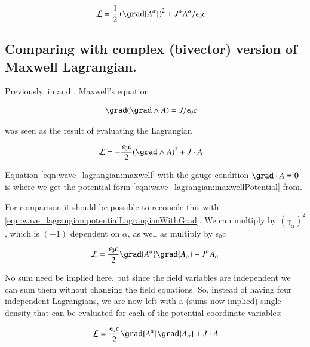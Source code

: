 \begin{align}\label{eqn:wave_lagrangian:potentialLagrangianWithGrad}
\LL &= \inv{2} \left( \grad {A^\alpha} \right)^2 + J^\alpha A^\alpha / \epsilon_0 c
\end{align}

\subsection{Comparing with complex (bivector) version of Maxwell Lagrangian. }
Previously, in \cite{PJMaxwellLagrangian} and \cite{PJFieldLagrangian}, Maxwell's equation 

\begin{align}\label{eqn:wave_lagrangian:maxwell}
\grad (\grad \wedge A) &= J/ \epsilon_0 c
\end{align}

was seen as the result of evaluating the Lagrangian

\begin{align}\label{eqn:wave_lagrangian:maxlag}
\LL &= -\frac{\epsilon_0 c}{2} (\grad \wedge A)^2 + J \cdot A
\end{align}

Equation \ref{eqn:wave_lagrangian:maxwell} with the gauge condition $\grad \cdot A = 0$
is where we get the potential form \ref{eqn:wave_lagrangian:maxwellPotential} from.

For comparison it should be possible to reconcile this with
\ref{eqn:wave_lagrangian:potentialLagrangianWithGrad}.  We can multiply by $(\gamma_\alpha)^2$, which is $(\pm 1)$ dependent on $\alpha$, as well as multiply by $\epsilon_0 c$

\begin{align*}
\LL &= \frac{\epsilon_0 c}{2} \grad {A^\alpha} \grad {A_\alpha} + J^\alpha A_\alpha \\
\end{align*}

No sum need be implied here, but since the field variables are independent we can sum them without changing the field equations.  So, instead of having four independent Lagrangians, we are now left with a (sums now implied) single density that can be evaluated for each of the potential coordinate variables:

\begin{align*}
\LL &= \frac{\epsilon_0 c}{2} \grad {A^\alpha} \grad {A_\alpha} + J \cdot A \\
\end{align*}

